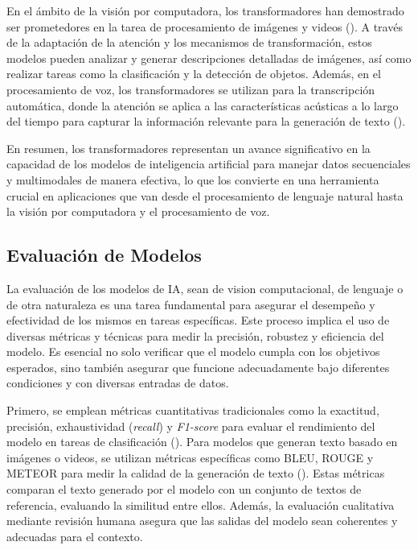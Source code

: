 En el ámbito de la visión por computadora, los transformadores han demostrado ser prometedores en la tarea de procesamiento de imágenes y videos (\cite{xu2023multimodal}). A través de la adaptación de la atención y los mecanismos de transformación, estos modelos pueden analizar y generar descripciones detalladas de imágenes, así como realizar tareas como la clasificación y la detección de objetos. Además, en el procesamiento de voz, los transformadores se utilizan para la transcripción automática, donde la atención se aplica a las características acústicas a lo largo del tiempo para capturar la información relevante para la generación de texto (\cite{moritz2020streaming}).

En resumen, los transformadores representan un avance significativo en la capacidad de los modelos de inteligencia artificial para manejar datos secuenciales y multimodales de manera efectiva, lo que los convierte en una herramienta crucial en aplicaciones que van desde el procesamiento de lenguaje natural hasta la visión por computadora y el procesamiento de voz.

\subsection{Evaluación de Modelos}

La evaluación de los modelos de IA, sean de vision computacional, de lenguaje o de otra naturaleza es una tarea fundamental para asegurar el desempeño y efectividad de los mismos en tareas específicas. Este proceso implica el uso de diversas métricas y técnicas para medir la precisión, robustez y eficiencia del modelo. Es esencial no solo verificar que el modelo cumpla con los objetivos esperados, sino también asegurar que funcione adecuadamente bajo diferentes condiciones y con diversas entradas de datos.

Primero, se emplean métricas cuantitativas tradicionales como la exactitud, precisión, exhaustividad (\textit{recall}) y \textit{F1-score} para evaluar el rendimiento del modelo en tareas de clasificación (\cite{jurafsky2000speech}). Para modelos que generan texto basado en imágenes o videos, se utilizan métricas específicas como BLEU, ROUGE y METEOR para medir la calidad de la generación de texto (\cite{papineni2002bleu}). Estas métricas comparan el texto generado por el modelo con un conjunto de textos de referencia, evaluando la similitud entre ellos. Además, la evaluación cualitativa mediante revisión humana asegura que las salidas del modelo sean coherentes y adecuadas para el contexto.

